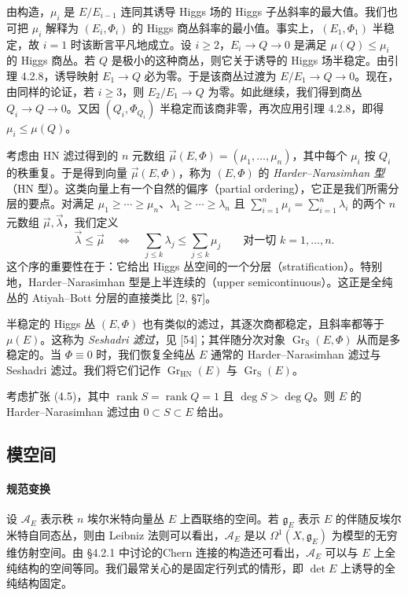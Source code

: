 \begin{remark}\label{rem:4.2.9}
由构造，$\mu_i$ 是 $E/E_{i-1}$ 连同其诱导 Higgs 场的 Higgs 子丛斜率的最大值。我们也可把 $\mu_i$ 解释为 $(E_i,\Phi_i)$ 的 Higgs 商丛斜率的最小值。事实上，$(E_1,\Phi_1)$ 半稳定，故 $i=1$ 时该断言平凡地成立。设 $i\ge2$，$E_i\to Q\to0$ 是满足 $\mu(Q)\le\mu_i$ 的 Higgs 商丛。若 $Q$ 是极小的这种商丛，则它关于诱导的 Higgs 场半稳定。由引理 4.2.8，诱导映射 $E_1\to Q$ 必为零。于是该商丛过渡为 $E/E_1\to Q\to0$。现在，由同样的论证，若 $i\ge3$，则 $E_2/E_1\to Q$ 为零。如此继续，我们得到商丛 $Q_i\to Q\to0$。又因 $(Q_i,\Phi_{Q_i})$ 半稳定而该商非零，再次应用引理 4.2.8，即得 $\mu_i\le\mu(Q)$。
\end{remark}

考虑由 HN 滤过得到的 $n$ 元数组 $\vec\mu(E,\Phi)=(\mu_1,\dots,\mu_n)$，其中每个 $\mu_i$ 按 $Q_i$ 的秩重复。于是得到向量 $\vec\mu(E,\Phi)$，称为 $(E,\Phi)$ 的 \emph{Harder--Narasimhan 型}（HN 型）。这类向量上有一个自然的偏序（partial ordering），它正是我们所需分层的要点。对满足 $\mu_1\ge\cdots\ge\mu_n$、$\lambda_1\ge\cdots\ge\lambda_n$ 且 $\sum_{i=1}^{n}\mu_i=\sum_{i=1}^{n}\lambda_i$ 的两个 $n$ 元数组 $\vec\mu,\vec\lambda$，我们定义
\[
\vec\lambda\le\vec\mu\quad\Longleftrightarrow\quad\sum_{j\le k}\lambda_j\le\sum_{j\le k}\mu_j\qquad\text{对一切 }k=1,\dots,n.
\]
这个序的重要性在于：它给出 Higgs 丛空间的一个分层（stratification）。特别地，Harder--Narasimhan 型是上半连续的（upper semicontinuous）。这正是全纯丛的 Atiyah--Bott 分层的直接类比 [2, §7]。

半稳定的 Higgs 丛 $(E,\Phi)$ 也有类似的滤过，其逐次商都稳定，且斜率都等于 $\mu(E)$。这称为 \emph{Seshadri 滤过}，见 [54]；其伴随分次对象 $\operatorname{Gr}_{\mathrm{S}}(E,\Phi)$ 从而是多稳定的。当 $\Phi\equiv0$ 时，我们恢复全纯丛 $E$ 通常的 Harder--Narasimhan 滤过与 Seshadri 滤过。我们将它们记作 $\operatorname{Gr}_{\mathrm{HN}}(E)$ 与 $\operatorname{Gr}_{\mathrm{S}}(E)$。

\begin{example}\label{ex:4.2.10}
考虑扩张 (4.5)，其中 $\operatorname{rank}S=\operatorname{rank}Q=1$ 且 $\deg S>\deg Q$。则 $E$ 的 Harder--Narasimhan 滤过由 $0\subset S\subset E$ 给出。
\end{example}

\subsection{模空间}

\paragraph{规范变换} 设 $\mathcal{A}_E$ 表示秩 $n$ 埃尔米特向量丛 $E$ 上酉联络的空间。若 $\mathfrak{g}_E$ 表示 $E$ 的伴随反埃尔米特自同态丛，则由 Leibniz 法则可以看出，$\mathcal{A}_E$ 是以 $\Omega^1(X,\mathfrak{g}_E)$ 为模型的无穷维仿射空间。由 §4.2.1 中讨论的Chern 连接的构造还可看出，$\mathcal{A}_E$ 可以与 $E$ 上全纯结构的空间等同。我们最常关心的是固定行列式的情形，即 $\det E$ 上诱导的全纯结构固定。

